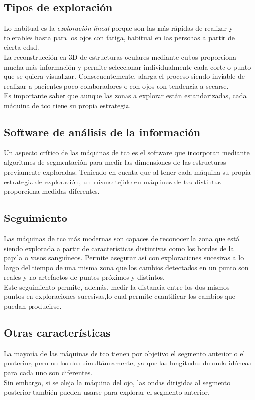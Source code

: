 \subsection{Tipos de exploración}\label{tco:exploracion}
Lo habitual es la \emph{exploración lineal} porque son las más rápidas
de realizar y tolerables hasta para los ojos con
fatiga, habitual en las personas a partir de cierta edad.\\
La reconstrucción en 3D de estructuras oculares mediante cubos
proporciona mucha más información y permite seleccionar
individualmente cada corte o punto que se quiera
visualizar. Consecuentemente, alarga el proceso siendo inviable de
realizar a pacientes poco colaboradores o con ojos con tendencia a
secarse.\\
Es importante saber que aunque las zonas a explorar están
estandarizadas, cada máquina de \gls{tco} tiene su propia estrategia.

\subsection{Software de análisis de la información}
Un aspecto crítico de las máquinas de \gls{tco} es el software que
incorporan mediante algoritmos de segmentación para medir las
dimensiones de las estructuras previamente exploradas. Teniendo en
cuenta que al tener cada máquina su propia estrategia de exploración,
un mismo tejido en máquinas de \gls{tco} distintas proporciona medidas
diferentes.

\subsection{Seguimiento}\label{tco:seguimiento}
Las máquinas de \gls{tco} más modernas son capaces de reconocer la
zona que está siendo explorada a partir de características distintivas
como los bordes de la papila o vasos sanguíneos. Permite asegurar así
con exploraciones sucesivas a lo largo del tiempo de una misma zona
que los cambios detectados en un punto son reales y no artefactos de
puntos próximos y distintos.\\
Este seguimiento permite, además, medir la distancia entre los dos
mismos puntos en exploraciones sucesivas,lo cual permite cuantificar
los cambios que puedan producirse.

\subsection{Otras características}
La mayoría de las máquinas de \gls{tco} tienen por objetivo el
segmento anterior o el posterior, pero no los dos simultáneamente, ya
que las longitudes de onda idóneas para cada uno son diferentes.\\
Sin embargo, si se aleja la máquina del ojo, las ondas dirigidas al
segmento posterior también pueden usarse para explorar el segmento
anterior.

